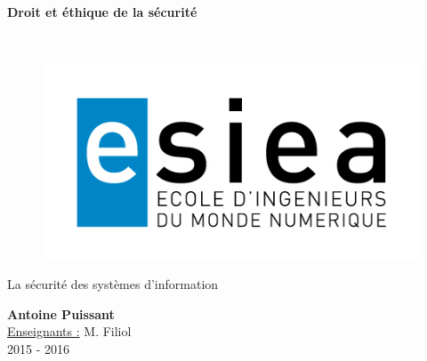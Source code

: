 \begin{titlepage}
      \begin{center}   
        \Huge
        \textbf{Droit et éthique de la sécurité}
        
        \LARGE
        ~
        
        
        \vfill
        \begin{figure}[H]
	    \centering
	    \begin{minipage}{0.9\textwidth}
		\centering
		\includegraphics[width=\textwidth]{./img/esiea.jpeg}
	    \end{minipage}\hfill
	\end{figure}
        \vfill
        
        \vspace{0.5cm}
        
        La sécurité des systèmes d'information
        
        \vspace{2cm}
        \textbf{Antoine Puissant}\\
        \vspace{0.8cm}
        \Large
        \underline{Enseignants :} M. Filiol\\
        \vspace{0.5cm}
        2015 - 2016%
        
    \end{center}
\end{titlepage}